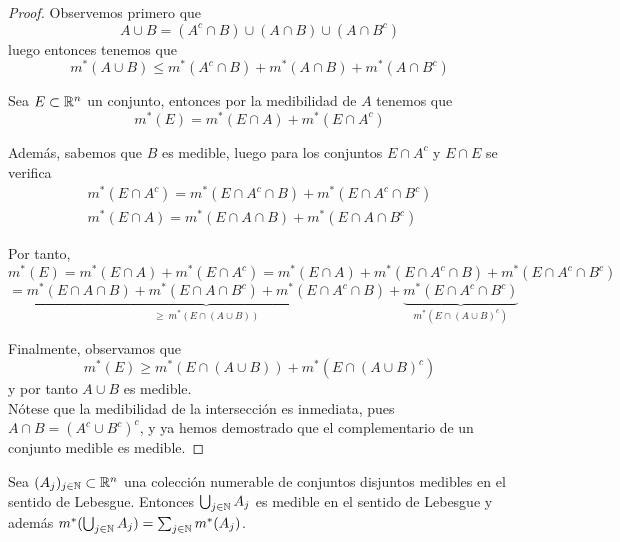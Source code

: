\begin{proof}
    Observemos primero que
    \[
        A \cup B = (A^c \cap B) \cup (A \cap B) \cup (A \cap B^c)
    \]
    luego entonces tenemos que
    \[
        m^*(A \cup B) \leq m^*(A^c \cap B) + m^*(A \cap B) + m^*(A \cap B^c)
    \]

    Sea \( E \subset \mathbb{R}^n \) un conjunto, entonces por la medibilidad de \( A \)
    tenemos que
    \[
        m^*(E) = m^*(E \cap A) + m^*(E \cap A^c)
    \]

    Además, sabemos que \( B \) es medible, luego para los conjuntos \( E \cap A^c
    \) y \(E \cap E\) se verifica
    \[
        \begin{matrix}
            m^*(E \cap A^c) = m^*(E \cap A^c \cap B) + m^*(E \cap A^c \cap B^c) \\
            m^*(E \cap A) = m^*(E \cap A \cap B) + m^*(E \cap A \cap B^c)
        \end{matrix}
    \]

    Por tanto,
    \[
        m^*(E) = m^*(E \cap A) + m^*(E \cap A^c) = m^*(E \cap A) + m^*(E \cap A^c \cap B) + m^*(E \cap A^c \cap B^c)
    \]
    \[
        = \underbrace{m^*(E \cap A \cap B) + m^*(E \cap A \cap B^c) + m^*(E \cap A^c \cap B)}_{\geq \ m^*(E \cap (A \cup B))} + \underbrace{m^*(E \cap A^c \cap B^c)}_{m^*(E \cap (A \cup B)^c)}
    \]

    Finalmente, observamos que
    \[
        m^*(E) \geq m^*(E \cap (A \cup B)) + m^*(E \cap (A \cup B)^c)
    \]
    y por tanto \( A \cup B \) es medible.\\ Nótese que la medibilidad de la
    intersección es inmediata, pues \( A \cap B = (A^c \cup B^c)^c \), y ya hemos
    demostrado que el complementario de un conjunto medible es medible.
\end{proof}

\begin{lema}
    Sea $(A_j)_{j \in \mathbb{N}} \subset \mathbb{R}^n$ una colección numerable de conjuntos disjuntos medibles en el sentido de Lebesgue. Entonces $\bigcup_{j \in \mathbb{N}} A_j$ es medible en el sentido de Lebesgue y además $m^*(\bigcup_{j \in \mathbb{N}} A_j) = \sum_{j \in \mathbb{N}} m^*(A_j)$.
    \label{unionNumerableMedible}
\end{lema}

